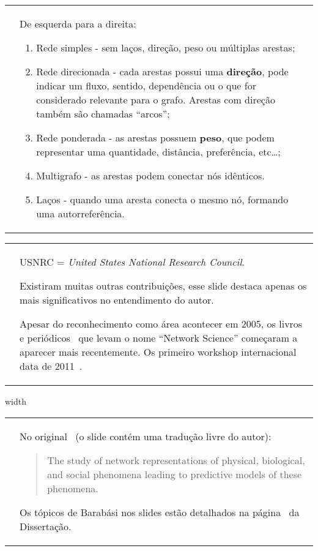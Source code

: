 \documentclass[10pt,a4paper,final]{article}
\newcommand\disappearingrule{%
  \par %
  \vskip10pt %
  \leaders\vrule width \textwidth\vskip0.4pt %
  \nointerlineskip %
  \vskip10pt %
}
\begin{document}
\begin{tabular}{p{.45\linewidth} P{.45\linewidth}}
  \vspace{0pt}
  &
  \vspace{2pt}
  De esquerda para a direita:
  \begin{enumerate}
    \item Rede simples - sem laços, direção, peso ou múltiplas arestas;
    \item Rede direcionada - cada arestas possui uma \textbf{direção}, pode indicar um fluxo, sentido, dependência ou o que for considerado relevante para o grafo. Arestas com direção também são chamadas \enquote{arcos};
    \item Rede ponderada - as arestas possuem \textbf{peso}, que podem representar uma quantidade, distância, preferência, etc\ldots;
    \item Multigrafo - as arestas podem conectar nós idênticos.
    \item Laços - quando uma aresta conecta o mesmo nó, formando uma autorreferência.
  \end{enumerate}
  
\end{tabular}

\begin{tabular}{p{.45\linewidth} P{.45\linewidth}}
  \vspace{0pt}
  &
  \vspace{2pt}
  USNRC = \textit{United States National Research Council}.
  
  Existiram muitas outras contribuições, esse slide destaca apenas os mais significativos no entendimento do autor.
  
  Apesar do reconhecimento como área acontecer em 2005, os livros~\cite{Barabasi2016-rn} e periódicos~\cite{Facebookcomspringeropn2016-wf} que levam o nome \enquote{Network Science} começaram a aparecer mais recentemente. Os primeiro workshop internacional data de 2011~\cite{Ieee2011-ti}.
\end{tabular}

\disappearingrule

\begin{tabular}{p{.5\linewidth} P{.48\linewidth}}
  \vspace{0pt}
  &
  \vspace{2pt}
  No original~\cite{National_Research_Council2006-lv} (o slide contém uma tradução livre do autor):
  \begin{quote}
    The study of network representations of physical, biological, and social phenomena leading to predictive models of these phenomena.
  \end{quote}

  Os tópicos de Barabási nos slides estão detalhados na página~\pageref{desc:ciencia-de-redes} da Dissertação.
\end{tabular}
\end{document}

